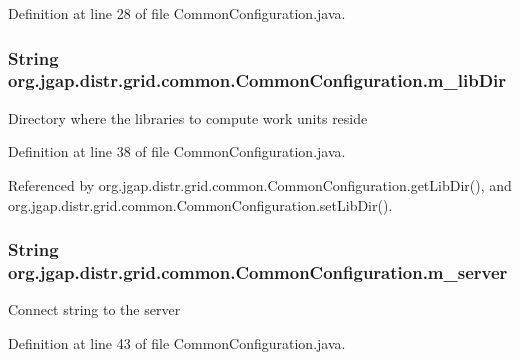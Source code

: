 Definition at line 28 of file Common\-Configuration.\-java.

\hypertarget{classorg_1_1jgap_1_1distr_1_1grid_1_1common_1_1_common_configuration_aafbacb19c3cd160c3051bda6674da6c1}{
\subsubsection[{m\-\_\-lib\-Dir}]{\setlength{\rightskip}{0pt plus 5cm}String org.\-jgap.\-distr.\-grid.\-common.\-Common\-Configuration.\-m\-\_\-lib\-Dir\hspace{0.3cm}{\ttfamily [private]}}}\label{classorg_1_1jgap_1_1distr_1_1grid_1_1common_1_1_common_configuration_aafbacb19c3cd160c3051bda6674da6c1}
Directory where the libraries to compute work units reside 

Definition at line 38 of file Common\-Configuration.\-java.



Referenced by org.\-jgap.\-distr.\-grid.\-common.\-Common\-Configuration.\-get\-Lib\-Dir(), and org.\-jgap.\-distr.\-grid.\-common.\-Common\-Configuration.\-set\-Lib\-Dir().

\hypertarget{classorg_1_1jgap_1_1distr_1_1grid_1_1common_1_1_common_configuration_af620834aa79c9007cbdc8c6e6680a467}{
\subsubsection[{m\-\_\-server}]{\setlength{\rightskip}{0pt plus 5cm}String org.\-jgap.\-distr.\-grid.\-common.\-Common\-Configuration.\-m\-\_\-server\hspace{0.3cm}{\ttfamily [private]}}}\label{classorg_1_1jgap_1_1distr_1_1grid_1_1common_1_1_common_configuration_af620834aa79c9007cbdc8c6e6680a467}
Connect string to the server 

Definition at line 43 of file Common\-Configuration.\-java.



